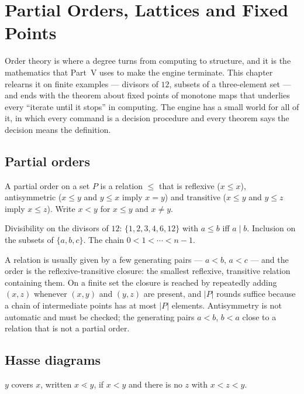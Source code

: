 \chapter{Partial Orders, Lattices and Fixed Points}\label{ch:posets}

Order theory is where a degree turns from computing to structure, and it is the mathematics
that Part~V uses to make the engine terminate. This chapter relearns it on finite examples ---
divisors of $12$, subsets of a three-element set --- and ends with the theorem about fixed points
of monotone maps that underlies every ``iterate until it stops'' in computing. The engine has a
small world for all of it, in which every command is a decision procedure and every theorem says
the decision means the definition.

\section{Partial orders}

\begin{definition}
  A partial order on a set $P$ is a relation $\le$ that is reflexive ($x \le x$), antisymmetric
  ($x \le y$ and $y \le x$ imply $x = y$) and transitive ($x \le y$ and $y \le z$ imply $x \le z$).
  Write $x < y$ for $x \le y$ and $x \neq y$.
\end{definition}

\begin{example}
  Divisibility on the divisors of $12$: $\{1, 2, 3, 4, 6, 12\}$ with $a \le b$ iff $a \mid b$.
  Inclusion on the subsets of $\{a, b, c\}$. The chain $0 < 1 < \cdots < n - 1$.
\end{example}

A relation is usually given by a few generating pairs --- $a < b$, $a < c$ --- and the order is
the reflexive-transitive closure: the smallest reflexive, transitive relation containing them.
On a finite set the closure is reached by repeatedly adding $(x, z)$ whenever $(x, y)$ and $(y, z)$
are present, and $|P|$ rounds suffice because a chain of intermediate points has at most $|P|$
elements. Antisymmetry is not automatic and must be checked; the generating pairs $a < b$,
$b < a$ close to a relation that is not a partial order.

\section{Hasse diagrams}

\begin{definition}[Covers]
  $y$ covers $x$, written $x \lessdot y$, if $x < y$ and there is no $z$ with $x < z < y$.
\end{definition}

